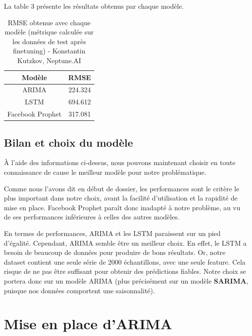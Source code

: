 \documentclass[french]{article}
\begin{document}
    La table 3 présente les résultats obtenus par chaque modèle.
    \begin{table}[h!]
        \begin{center}
            \begin{tabular}{ |c|c| }
                \hline
                Modèle & RMSE \\
                \hline
                ARIMA & 224.324 \\ 
                \hline
                LSTM & 694.612 \\  
                \hline
                Facebook Prophet & 317.081 \\
                \hline
            \end{tabular}
            \caption{RMSE obtenue avec chaque modèle (métrique calculée sur les données de test après finetuning) - Konstantin Kutzkov, Neptune.AI}
            \label{table:1}
        \end{center}
    \end{table}

    \subsection{Bilan et choix du modèle}
    À l'aide des informations ci-dessus, nous pouvons maintenant choisir en toute connaissance de cause le meilleur modèle pour notre problématique.

    Comme nous l'avons dit en début de dossier, les performances sont le critère le plus important dans notre choix, avant la facilité d'utilisation et la rapidité de mise en place. Facebook Prophet paraît donc inadapté à notre problème, au vu de ses performances inférieures à celles des autres modèles.

    En termes de performances, ARIMA et les LSTM paraissent sur un pied d'égalité. Cependant, ARIMA semble être un meilleur choix. En effet, le LSTM a besoin de beaucoup de données pour produire de bons résultats. Or, notre dataset contient une seule série de 2000 échantillons, avec une seule feature. Cela risque de ne pas être suffisant pour obtenir des prédictions fiables. Notre choix se portera donc sur un modèle ARIMA (plus précisément sur un modèle \textbf{SARIMA}, puisque nos données comportent une saisonnalité).
    
    \section{Mise en place d'ARIMA}
\end{document}

